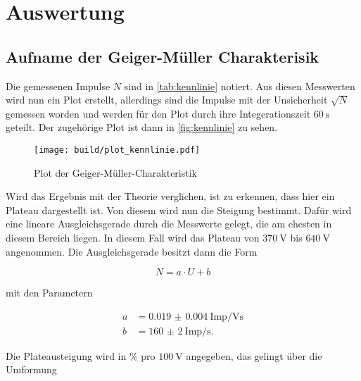 \section{Auswertung}
\label{sec:Auswertung}



\subsection{Aufname der Geiger-Müller Charakterisik}
\label{ssec:a1}

Die gemessenen Impulse $N$ sind in \autoref{tab:kennlinie} notiert.
Aus diesen Messwerten wird nun ein Plot erstellt, allerdings sind die Impulse mit der Unsicherheit $\sqrt{N}$ gemessen worden und werden für den Plot durch ihre Integerationszeit $\SI{60}{\second}$ geteilt.
Der zugehörige Plot ist dann in \autoref{fig:kennlinie} zu sehen.

\begin{figure}
    \centering
    \texttt{[image: build/plot\_kennlinie.pdf]}
    \caption{Plot der Geiger-Müller-Charakteristik}
    \label{fig:kennlinie}
\end{figure}

Wird das Ergebnis mit der Theorie verglichen, ist zu erkennen, dass hier ein Plateau dargestellt ist.
Von diesem wird nun die Steigung bestimmt.
Dafür wird eine lineare Ausgleichsgerade durch die Messwerte gelegt, die am ehesten in diesem Bereich liegen.
In diesem Fall wird das Plateau von $\SI{370}{\volt}$ bis $\SI{640}{\volt}$ angenommen.
Die Ausgleichsgerade besitzt dann die Form

\begin{equation}
    N = a \cdot U + b
\end{equation}

mit den Parametern

\begin{align}
    a &= \SI{0.019(4)}{\text{Imp}\per\volt\second}\\
    b &= \SI{160(2)}{\text{Imp}\per\second}.
\end{align}

Die Plateausteigung wird in $\%$ pro $\SI{100}{\volt}$ angegeben, das gelingt über die Umformung 

